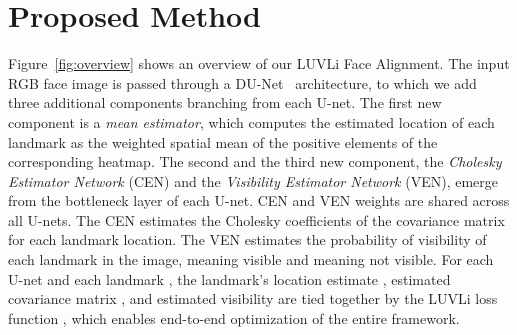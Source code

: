 \documentclass[10pt,twocolumn,letterpaper]{article}
\newcommand{\1}{{\bf 1}}
\newcommand{\0}{{\bf 0}}
\begin{document}
\section{Proposed Method}\label{sec:method}
\vspace{-0.15cm}
    Figure~\ref{fig:overview} shows an overview of our LUVLi Face Alignment. The input RGB face image is passed through a \mbox{DU-Net}~\cite{tang2019towards} architecture, to which we add three additional components branching from each U-net. The first new component is a \emph{mean estimator}, which computes the estimated location of each landmark as the weighted spatial mean of the positive elements of the corresponding heatmap. The second and the third new component, the \emph{Cholesky Estimator Network} (CEN) and the \emph{Visibility Estimator Network} (VEN), emerge from the bottleneck layer of each U-net. CEN and VEN weights are shared across all U-nets. The CEN estimates the Cholesky coefficients of the covariance matrix for each landmark location. The VEN estimates the probability of visibility of each landmark in the image,  meaning visible and  meaning not visible. For each U-net  and each landmark , the landmark's location estimate , estimated covariance matrix , and estimated visibility  are tied together by the LUVLi loss function , which enables end-to-end optimization of the entire framework.
\end{document}

